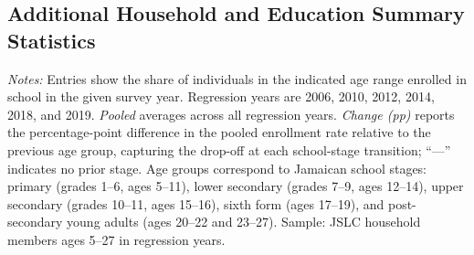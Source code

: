 \documentclass[12pt]{article}
\newcommand*{\TableSumPath}{../Paper_3_Tables/Summary_Stats}
\begin{document}
	\FloatBarrier

	\subsection{Additional Household and Education Summary Statistics}
	\label{subsec:app_hh_stats}


\begin{table}[H]
\centering
\begin{threeparttable}
    \caption{School Enrollment Rates by Age Group and Year}
    \label{tab:enrollment_by_age_year}
    {\small}
    \begin{tablenotes}
        \small
        \item \textit{Notes:} Entries show the share of individuals in the indicated age range enrolled in school in the given survey year. Regression years are 2006, 2010, 2012, 2014, 2018, and 2019. \textit{Pooled} averages across all regression years. \textit{Change (pp)} reports the percentage-point difference in the pooled enrollment rate relative to the previous age group, capturing the drop-off at each school-stage transition; ``---'' indicates no prior stage. Age groups correspond to Jamaican school stages: primary (grades 1--6, ages 5--11), lower secondary (grades 7--9, ages 12--14), upper secondary (grades 10--11, ages 15--16), sixth form (ages 17--19), and post-secondary young adults (ages 20--22 and 23--27). Sample: JSLC household members ages 5--27 in regression years.
    \end{tablenotes}
\end{threeparttable}
\end{table}
\end{document}
